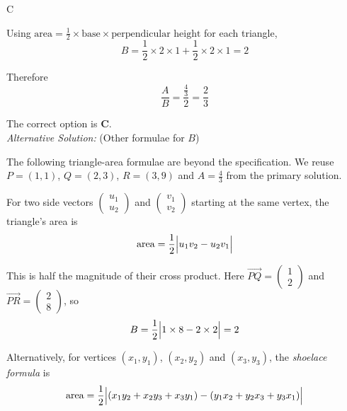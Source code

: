 \documentclass[11pt,a4paper]{article}
\begin{document}
\begin{enumerate}[label=\textbf{\arabic*.},leftmargin=*,itemsep=0pt,start=13]
\begin{djsSolution}{C}
\begin{djsSolutionFigure}
\end{djsSolutionFigure}

Using $\text{area}=\frac12\times\text{base}\times\text{perpendicular height}$ for each triangle,
\[
B=\frac12\times2\times1+\frac12\times2\times1=2
\]

Therefore
\[
\frac{A}{B}=\frac{\frac43}{2}=\frac23
\]

The correct option is \textbf{C}.\\[5pt]

\textit{Alternative Solution:} (Other formulae for $B$)

The following triangle-area formulae are beyond the specification. We reuse $P=(1,1)$, $Q=(2,3)$, $R=(3,9)$ and $A=\frac43$ from the primary solution.

For two side vectors $\begin{pmatrix}u_1\\u_2\end{pmatrix}$ and $\begin{pmatrix}v_1\\v_2\end{pmatrix}$ starting at the same vertex, the triangle's area is
\[
\text{area}=\frac12\Bigl|u_1v_2-u_2v_1\Bigr|
\]

This is half the magnitude of their cross product. Here $\overrightarrow{PQ}=\begin{pmatrix}1\\2\end{pmatrix}$ and $\overrightarrow{PR}=\begin{pmatrix}2\\8\end{pmatrix}$, so
\[
B=\frac12\Bigl|1\times8-2\times2\Bigr|=2
\]

Alternatively, for vertices $(x_1,y_1)$, $(x_2,y_2)$ and $(x_3,y_3)$, the \emph{shoelace formula} is
\[
\text{area}
=\frac12\Bigl|
(x_1y_2+x_2y_3+x_3y_1)
-(y_1x_2+y_2x_3+y_3x_1)
\Bigr|
\]


\end{djsSolution}
\end{enumerate}
\end{document}
